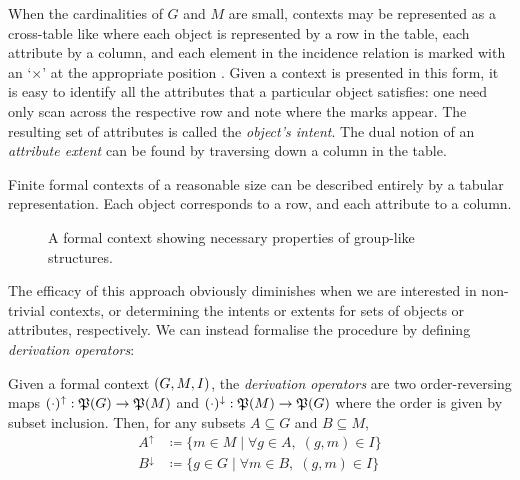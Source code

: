 When the cardinalities of $G$ and $M$ are small, contexts may be represented as a cross-table like  where each object is represented by a row in the table, each attribute by a column, and each element in the incidence relation is marked with an `$\times$' at the appropriate position \cite[pp. 17]{ganter1999formal}. Given a context is presented in this form, it is easy to identify all the attributes that a particular object satisfies: one need only scan across the respective row and note where the marks appear. The resulting set of attributes is called the \textit{object's intent}. The dual notion of an \textit{attribute extent} can be found by traversing down a column in the table.
\begin{example}
  \label{example:first-example-formal-context}
  Finite formal contexts of a reasonable size can be described entirely by a tabular representation. Each object corresponds to a row, and each attribute to a column.

  \begin{figure}[H]
    \centering
    \small
    \begin{cxt}
    \label{cxt:grouplikes}
          
    \end{cxt}
    \caption{A formal context showing necessary properties of group-like structures.}
    \label{context:formal-context-group-structures}
  \end{figure}
\end{example}

The efficacy of this approach obviously diminishes when we are interested in non-trivial contexts, or determining the intents or extents for sets of objects or attributes, respectively. We can instead formalise the procedure by defining \textit{derivation operators}:

\begin{definition}
     \label{definition:derivation-operators} 
  Given a formal context $(G,M,\mathrel{I})$, the \textit{derivation operators} are two order-reversing maps $(\cdot)^\uparrow : \mathfrak{P}({G}) \to \mathfrak{P}({M})$ and $(\cdot)^\downarrow : \mathfrak{P}({M}) \to \mathfrak{P}({G})$ where the order is given by subset inclusion. Then, for any subsets $A \subseteq G$ and $B \subseteq M$,
  \begin{align*}
       A^\uparrow & \coloneqq \{m \in M \mid \forall g \in A, \; (g,m) \in I\} \\
       B^\downarrow & \coloneqq \{g \in G \mid \forall m \in B, \; (g,m) \in I\}
  \end{align*}
\end{definition}

